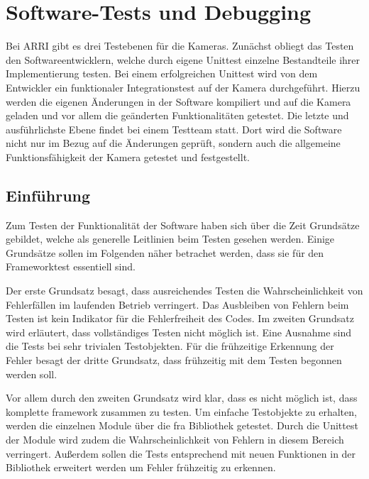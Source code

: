 
\chapter{Software-Tests und Debugging} \label{sec:test}
Bei \ac{ARRI} gibt es drei Testebenen für die Kameras. Zunächst obliegt das Testen den Softwareentwicklern, welche durch eigene Unittest einzelne Bestandteile ihrer Implementierung testen. Bei einem erfolgreichen Unittest wird von dem Entwickler ein funktionaler Integrationstest auf der Kamera durchgeführt. Hierzu werden die eigenen Änderungen in der Software kompiliert und auf die Kamera geladen und vor allem die geänderten Funktionalitäten getestet. Die letzte und ausführlichste Ebene findet bei einem Testteam statt. Dort wird die Software nicht nur im Bezug auf die Änderungen geprüft, sondern auch die allgemeine Funktionsfähigkeit der Kamera getestet und festgestellt.


\section{Einführung}
Zum Testen der Funktionalität der Software haben sich über die Zeit Grundsätze gebildet, welche als generelle Leitlinien beim Testen gesehen werden. \citep[S. 53]{spillner2005basiswissen}
Einige Grundsätze sollen im Folgenden näher betrachet werden, dass sie für den Frameworktest essentiell sind. 

Der erste Grundsatz besagt, dass ausreichendes Testen die Wahrscheinlichkeit von Fehlerfällen im laufenden Betrieb verringert. Das Ausbleiben von Fehlern beim Testen ist kein Indikator für die Fehlerfreiheit des Codes.
Im zweiten Grundsatz wird erläutert, dass vollständiges Testen nicht möglich ist. Eine Ausnahme sind die Tests bei sehr trivialen Testobjekten. 
Für die frühzeitige Erkennung der Fehler besagt der dritte Grundsatz, dass frühzeitig mit dem Testen begonnen werden soll. \citep[S. 53]{spillner2005basiswissen}


Vor allem durch den zweiten Grundsatz wird klar, dass es nicht möglich ist, dass komplette \gls{framework} zusammen zu testen. Um einfache Testobjekte zu erhalten, werden die einzelnen Module über die \ac{fra} Bibliothek getestet. Durch die Unittest der Module wird zudem die Wahrscheinlichkeit von Fehlern in diesem Bereich verringert. Außerdem sollen die Tests entsprechend mit neuen Funktionen in der Bibliothek erweitert werden um Fehler frühzeitig zu erkennen.


